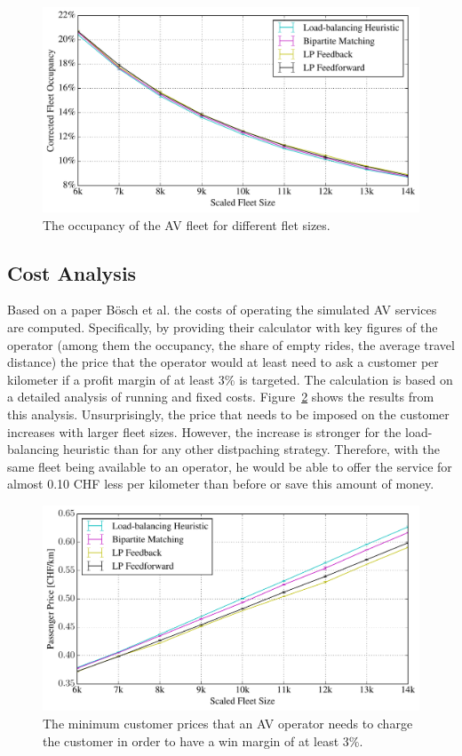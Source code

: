 \begin{figure}
\includegraphics[width=1.0\textwidth]{figures/occupancy.pdf}
\caption{The occupancy of the AV fleet for different flet sizes.}
\label{fig:occupancy}
\end{figure}

\subsection{Cost Analysis}
\label{sec:cost_analysis}

Based on a paper Bösch et al. \cite{cost_paper} the costs of operating the simulated AV services are computed. Specifically, by providing their calculator with key figures of the operator (among them the occupancy, the share of empty rides, the average travel distance) the price that the operator would at least need to ask a customer per kilometer if a profit margin of at least 3\% is targeted. The calculation is based on a detailed analysis of running and fixed costs. Figure~\ref{fig:passenger_price} shows the results from this analysis. Unsurprisingly, the price that needs to be imposed on the customer increases with larger fleet sizes. However, the increase is stronger for the load-balancing heuristic than for any other distpaching strategy. Therefore, with the same fleet being available to an operator, he would be able to offer the service for almost 0.10 CHF less per kilometer than before or save this amount of money.

\begin{figure}
\includegraphics[width=1.0\textwidth]{figures/01_passenger_price.pdf}
\caption{The minimum customer prices that an AV operator needs to charge the customer
in order to have a win margin of at least 3\%.}
\label{fig:passenger_price}
\end{figure}

